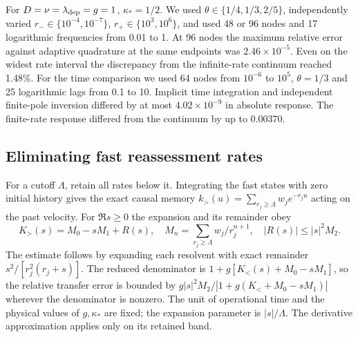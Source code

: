 \documentclass[11pt]{article}
\begin{document}
For \(D=\nu=\lambda_{\rm dep}=g=1\), \(\kappa_*=1/2\). We used
\(\theta\in\{1/4,1/3,2/5\}\), independently varied \(r_-\in\{10^{-4},10^{-7}\}\),
\(r_+\in\{10^3,10^6\}\), and used 48 or 96 nodes and 17 logarithmic
frequencies from 0.01 to 1. At 96 nodes the maximum relative error against
adaptive quadrature at the same endpoints was \(2.46\times10^{-5}\).
Even on the widest rate interval the discrepancy from the infinite-rate
continuum reached 1.48\%. For the time comparison we used 64 nodes from
\(10^{-6}\) to \(10^5\), \(\theta=1/3\) and 25 logarithmic lags from
0.1 to 10. Implicit time integration and independent finite-pole inversion
differed by at most \(4.02\times10^{-9}\) in absolute response. The
finite-rate response differed from the continuum by up to 0.00370.

\subsection{Eliminating fast reassessment rates}
For a cutoff \(\Lambda\), retain all rates below it. Integrating the fast
states with zero initial history gives the exact causal memory
\(k_>(u)=\sum_{r_j\ge\Lambda} w_j e^{-r_ju}\) acting on the past velocity.
For \(\Re s\ge0\) the expansion and its remainder obey
\[
 K_>(s)=M_0-sM_1+R(s),\quad
 M_n=\sum_{r_j\ge\Lambda}w_j/r_j^{n+1},\quad |R(s)|\le |s|^2 M_2 .
\]
The estimate follows by expanding each resolvent with exact remainder
\(s^2/[r_j^2(r_j+s)]\). The reduced denominator is
\(1+g[K_<(s)+M_0-sM_1]\), so the relative transfer error is bounded by
\(g|s|^2 M_2/|1+g(K_<+M_0-sM_1)|\) wherever the denominator is nonzero.
The unit of operational time and the physical values of \(g,\kappa_*\)
are fixed; the expansion parameter is \(|s|/\Lambda\).
The derivative approximation applies only on its retained band.
\end{document}
